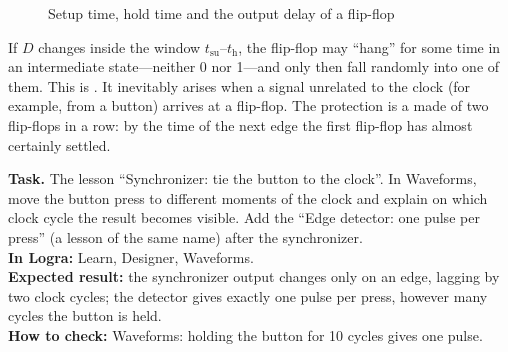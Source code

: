 \begin{figure}[H]
\centering
{}
\caption{Setup time, hold time and the output delay of a flip-flop}
\label{fig:setup_hold}
\end{figure}

\begin{warnbox}[Metastability]
If $D$ changes inside the window $t_\text{su}$--$t_\text{h}$, the flip-flop may
``hang'' for some time in an intermediate state---neither 0 nor 1---and
only then fall randomly into one of them. This is . It
inevitably arises when a signal unrelated to the clock (for example, from a
button) arrives at a flip-flop. The protection is a  made of
two flip-flops in a row: by the time of the next edge the first flip-flop has
almost certainly settled.
\end{warnbox}

\begin{diybox}
\textbf{Task.}  The lesson ``Synchronizer: tie the button to the clock''.
 In Waveforms, move the button press to different moments of the clock
and explain on which clock cycle the result becomes visible.  Add the
``Edge detector: one pulse per press'' (a lesson of the same name) after the
synchronizer.\\
\textbf{In Logra:} Learn, Designer, Waveforms.\\
\textbf{Expected result:} the synchronizer output changes only on an edge,
lagging by two clock cycles; the detector gives exactly one pulse per press,
however many cycles the button is held.\\
\textbf{How to check:} Waveforms: holding the button for 10 cycles gives
one pulse.
\end{diybox}

